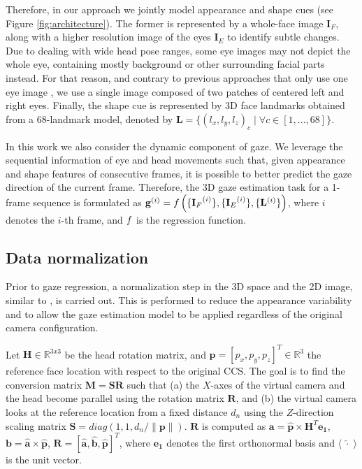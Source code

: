 \documentclass{bmvc2k}
\begin{document}
Therefore, in our approach we jointly model appearance and shape cues (see Figure \ref{fig:architecture}). The former is represented by a whole-face image $\mathbf{I}_F$, along with a higher resolution image of the eyes $\mathbf{I}_E$ to identify subtle changes. Due to dealing with wide head pose ranges, some eye images may not depict the whole eye, containing mostly background or other surrounding facial parts instead. For that reason, and contrary to previous approaches that only use one eye image \cite{zhang2015appearance, sugano2014learning}, we use a single image composed of two patches of centered left and right eyes. Finally, the shape cue is represented by 3D face landmarks obtained from a 68-landmark model, denoted by $\mathbf{L} = \{(l_x, l_y, l_z)_c \mid \forall c \in [1,...,68]\}$.

In this work we also consider the dynamic component of gaze. We leverage the sequential information of eye and head movements such that, given appearance and shape features of consecutive frames, it is possible to better predict the gaze direction of the current frame. Therefore, the 3D gaze estimation task for a 1-frame sequence is formulated as $\mathbf{g}^{(i)} = {\Large \mathnormal{f}}\left(\{{\mathbf{I}_F}^{(i)}\}, \{{\mathbf{I}_E}^{(i)}\}, \{\mathbf{L}^{(i)}\}\right)$, where $i$ denotes the $i$-th frame, and $\mathnormal{f}$ is the regression function.

\subsection{Data normalization}
\label{sec:normalization}

Prior to gaze regression, a normalization step in the 3D space and the 2D image, similar to \cite{sugano2014learning}, is carried out. This is performed to reduce the appearance variability and to allow the gaze estimation model to be applied regardless of the original camera configuration.

Let $\mathbf{H} \in \mathbb{R}^{3x3}$ be the head rotation matrix, and  $\mathbf{p} = [p_x,p_y,p_z]^T \in \mathbb{R}^3$ the reference face location with respect to the original CCS. The goal is to find the conversion matrix  $\mathbf{M} = \mathbf{S} \mathbf{R}$ such that (a) the $X$-axes of the virtual camera and the head become parallel using the rotation matrix $\mathbf{R}$, and (b) the virtual camera looks at the reference location from a fixed distance $d_n$ using the $Z$-direction scaling matrix $\mathbf{S} = diag(1,1, d_n/\lVert \mathbf{p} \rVert)$. $\mathbf{R}$ is computed as $\mathbf{a} = \mathbf{\hat{p}} \times \mathbf{H}^T \mathbf{e_1}$, $\mathbf{b} = \mathbf{\hat{a}} \times \mathbf{\hat{p}}$, $\mathbf{R} = [\mathbf{\hat{a}}, \mathbf{\hat{b}}, \mathbf{\hat{p}}]^T$, where $\mathbf{e_1}$ denotes the first orthonormal basis and $\langle \; \hat{\cdot} \; \rangle$ is the unit vector. 
\end{document}
